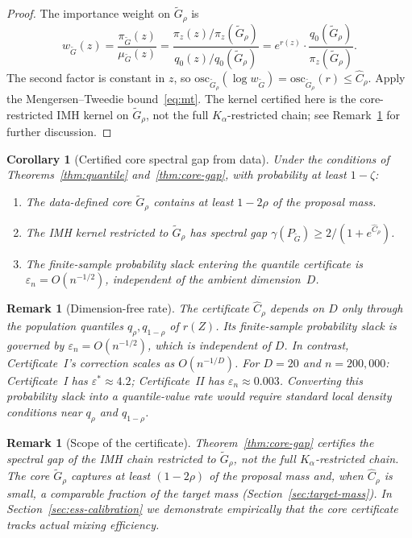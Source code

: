 \documentclass[12pt]{article}
\newtheorem{corollary}[theorem]{Corollary}
\newtheorem{remark}[theorem]{Remark}
\newcommand{\osc}{\mathrm{osc}}
\begin{document}
\begin{proof}
The importance weight on $\tilde{G}_\rho$ is
\[
  w_{\tilde{G}}(z) = \frac{\pi_{\tilde{G}}(z)}{\mu_{\tilde{G}}(z)}
  = \frac{\pi_z(z)/\pi_z(\tilde{G}_\rho)}{q_0(z)/q_0(\tilde{G}_\rho)}
  = e^{r(z)} \cdot \frac{q_0(\tilde{G}_\rho)}{\pi_z(\tilde{G}_\rho)}.
\]
The second factor is constant in $z$, so $\osc_{\tilde{G}_\rho}(\log w_{\tilde{G}}) = \osc_{\tilde{G}_\rho}(r) \le \hat{C}_\rho$.
Apply the Mengersen--Tweedie bound~\eqref{eq:mt}.
The kernel certified here is the core-restricted IMH kernel on $\tilde{G}_\rho$, not the full $K_\alpha$-restricted chain; see Remark~\ref{rem:scope} for further discussion.
\end{proof}


\begin{corollary}[Certified core spectral gap from data]\label{cor:certified}
Under the conditions of Theorems~\ref{thm:quantile} and~\ref{thm:core-gap}, with probability at least $1-\zeta$:
\begin{enumerate}[nosep]
\item The data-defined core $\tilde{G}_\rho$ contains at least $1-2\rho$ of the proposal mass.
\item The IMH kernel restricted to $\tilde{G}_\rho$ has spectral gap $\gamma(P_{\tilde{G}}) \ge 2/(1 + e^{\hat{C}_\rho})$.
\item The finite-sample probability slack entering the quantile certificate is $\varepsilon_n = O(n^{-1/2})$, independent of the ambient dimension~$D$.
\end{enumerate}
\end{corollary}


\begin{remark}[Dimension-free rate]\label{rem:dim-free}
The certificate $\hat{C}_\rho$ depends on $D$ only through the population quantiles $q_\rho, q_{1-\rho}$ of $r(Z)$.
Its finite-sample probability slack is governed by $\varepsilon_n = O(n^{-1/2})$, which is independent of $D$.
In contrast, Certificate~I's correction scales as $O(n^{-1/D})$.
For $D = 20$ and $n = 200{,}000$: Certificate~I has $\varepsilon^* \approx 4.2$; Certificate~II has $\varepsilon_n \approx 0.003$.
Converting this probability slack into a quantile-value rate would require standard local density conditions near $q_\rho$ and $q_{1-\rho}$.
\end{remark}


\begin{remark}[Scope of the certificate]\label{rem:scope}
Theorem~\ref{thm:core-gap} certifies the spectral gap of the IMH chain \emph{restricted to $\tilde{G}_\rho$}, not the full $K_\alpha$-restricted chain.
The core $\tilde{G}_\rho$ captures at least $(1-2\rho)$ of the proposal mass and, when $\hat{C}_\rho$ is small, a comparable fraction of the target mass (Section~\ref{sec:target-mass}).
In Section~\ref{sec:ess-calibration} we demonstrate empirically that the core certificate tracks actual mixing efficiency.
\end{remark}
\end{document}
